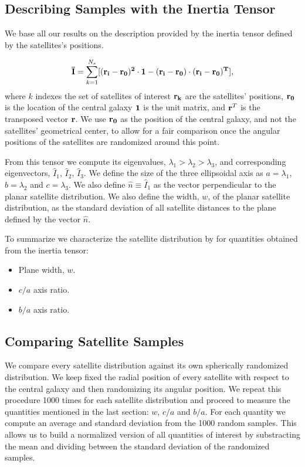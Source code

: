 \documentclass[a4paper,fleqn,usenatbib]{mnras}
\begin{document}
\subsection{Describing Samples with the Inertia Tensor}
We base all our results on the description provided by the inertia
tensor defined by the satellites's positions.  

\begin{equation}
{\bf{\bar{I}}} = \sum_{k=1}^{N_s}[(\bf{r}_i - \bf{r}_0)^2\cdot \bf{1} -
  (\bf{r}_i-\bf{r}_0)\cdot (\bf{r}_i - \bf{r}_0)^{T}],
\end{equation}
%
where $k$ indexes the set of satellites of interest
$\bf{r}_k$ are the satellites' positions, $\bf{r}_{0}$ is the location
of the central galaxy $\bf{1}$ is the unit matrix,  and  
${\bf r}^T$ is the transposed vector $\bf{r}$. 
We use $\bf{r}_0$ as the position of the central galaxy, and not the
satellites' geometrical center, to allow for a fair comparison once
the angular positions of the satellites are randomized around this
point. 

From this tensor we compute its eigenvalues,
$\lambda_1>\lambda_2>\lambda_3$, and corresponding eigenvectors,
$\hat{I}_1$, $\hat{I}_2$, $\hat{I}_3$.
We define the size of the three ellipsoidal axis as
$a=\lambda_1$, $b=\lambda_2$ and $c=\lambda_3$.
We also define $\hat{n}\equiv \hat{I}_1$ as the vector perpendicular to the
planar satellite distribution. 
We also define the width, $w$, of the planar satellite distribution,
as the standard deviation of all satellite distances to the plane
defined by the vector $\hat{n}$.  



To summarize we characterize the satellite distribution by for
quantities obtained from the inertia tensor: 
\begin{itemize}
\item Plane width, $w$.
\item $c/a$ axis ratio.
\item $b/a$ axis ratio.
\end{itemize}


\subsection{Comparing Satellite Samples}

We compare every satellite distribution against its own spherically
randomized distribution.
We keep fixed the radial position of every satellite
with respect to the central galaxy and then randomizing its angular
position. 
We repeat this procedure 1000 times for each satellite distribution
and proceed to measure the quantities mentioned in the last section:
$w$, $c/a$ and $b/a$.
For each quantity we compute an average and standard deviation from
the 1000 random samples. 
This allows us to build a normalized version of all quantities of
interest by substracting the mean and dividing between the standard
deviation of the randomized samples.
\end{document}
